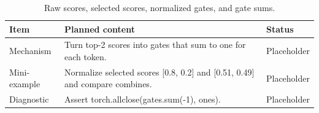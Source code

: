 \begin{table}[H]
\centering
\caption{Raw scores, selected scores, normalized gates, and gate sums.}
\label{tab:ch05-normalizing-selected-router-scores}
\begin{tabularx}{\textwidth}{p{}X p{}}
\toprule
Item & Planned content & Status \\
\midrule
Mechanism & Turn top-2 scores into gates that sum to one for each token. & Placeholder \\
Mini-example & Normalize selected scores [0.8, 0.2] and [0.51, 0.49] and compare combines. & Placeholder \\
Diagnostic & Assert torch.allclose(gates.sum(-1), ones). & Placeholder \\
\bottomrule
\end{tabularx}
\end{table}

